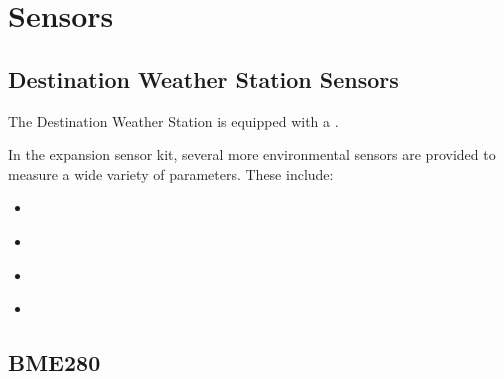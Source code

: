 \documentclass[letterpaper,10pt,english]{sphinxmanual}
\begin{document}
\chapter{Sensors}
\label{\detokenize{index:sensors}}
\sphinxstepscope


\section{Destination Weather Station \sphinxhyphen{} Sensors}
\label{\detokenize{sensors/index:destination-weather-station-sensors}}\label{\detokenize{sensors/index:sensors}}\label{\detokenize{sensors/index::doc}}
\sphinxAtStartPar
The Destination Weather Station is equipped with a {\hyperref[\detokenize{sensors/bme280:bme280}]{}}.

\sphinxAtStartPar
In the expansion sensor kit, several more environmental sensors are provided to measure a wide variety of parameters. These include:
\begin{itemize}
\item {} 
\sphinxAtStartPar
{\hyperref[\detokenize{sensors/ens160:ens160}]{}}

\item {} 
\sphinxAtStartPar
{\hyperref[\detokenize{sensors/ltr390:ltr390}]{}}

\item {} 
\sphinxAtStartPar
{\hyperref[\detokenize{sensors/scd40:scd40}]{}}

\item {} 
\sphinxAtStartPar
{\hyperref[\detokenize{sensors/veml7700:veml7700}]{}}

\end{itemize}

\sphinxstepscope


\section{BME280}
\label{\detokenize{sensors/bme280:bme280}}\label{\detokenize{sensors/bme280:id1}}\label{\detokenize{sensors/bme280::doc}}
\end{document}
